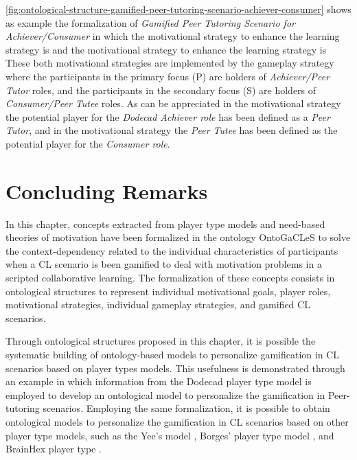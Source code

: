 \autoref{fig:ontological-structure-gamified-peer-tutoring-scenario-achiever-consumer} shows as example the formalization of \emph{Gamified Peer Tutoring Scenario for Achiever/Consumer} in which the motivational strategy to enhance the learning strategy  is  and the motivational strategy to enhance the learning strategy  is 
These both motivational strategies are implemented by the gameplay strategy  where the participants in the primary focus (P) are holders of \emph{Achiever/Peer Tutor} roles, and the participants in the secondary focus (S) are holders of \emph{Consumer/Peer Tutee} roles.
As can be appreciated in the motivational strategy  the potential player for the \emph{Dodecad Achiever role} has been defined as a \emph{Peer Tutor}, and in the motivational strategy  the \emph{Peer Tutee} has been defined as the potential player for the \emph{Consumer role}. 



\section{Concluding Remarks}
\label{sec:ontogacles1-concluding-remarks}

In this chapter, concepts extracted from player type models and need-based theories of motivation have been formalized in the ontology OntoGaCLeS to solve the context-dependency related to the individual characteristics of participants when a CL scenario is been gamified to deal with motivation problems in a scripted collaborative learning.
The formalization of these concepts consists in ontological structures to represent individual motivational goals, player roles, motivational strategies, individual gameplay strategies, and gamified CL scenarios.

Through ontological structures proposed in this chapter, it is possible the systematic building of ontology-based models to personalize gamification in CL scenarios based on player types models.
This usefulness is demonstrated through an example in which information from the Dodecad player type model is employed to develop an ontological model to personalize the gamification in Peer-tutoring scenarios.
Employing the same formalization, it is possible to obtain ontological models to personalize the gamification in CL scenarios based on other player type models, such as the Yee's model \cite{Yee2006}, Borges' player type model \cite{BorgesMizoguchiDurelliBittencourtIsotani2016}, and BrainHex player type \cite{NackeBatemanMandryk2014}.

